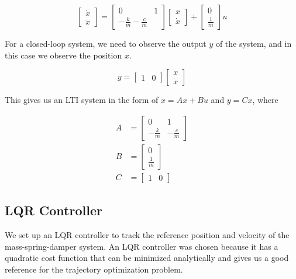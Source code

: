 \documentclass{article}
\begin{document}
\begin{equation}
  \begin{bmatrix}
    \dot{x} \\
    \ddot{x}
  \end{bmatrix} =
  \begin{bmatrix}
    0 & 1 \\
    -\frac{k}{m}  -\frac{c}{m}
  \end{bmatrix}
  \begin{bmatrix}
    x \\
    \dot{x}
  \end{bmatrix} +
  \begin{bmatrix}
    0 \\
    \frac{1}{m}
  \end{bmatrix} u
\end{equation}

For a closed-loop system, we need to observe the output $y$ of the system, and in this case we observe the position $x$.

\begin{equation}
  y =
  \begin{bmatrix}
    1 & 0
  \end{bmatrix}
  \begin{bmatrix}
    x \\
    \dot{x}
  \end{bmatrix}
\end{equation}

This gives us an LTI system in the form of $\dot{x} = Ax + Bu$ and $y = Cx$, where

\begin{equation}
  \begin{aligned}
    A &=
    \begin{bmatrix}
      0 & 1 \\
      -\frac{k}{m} & -\frac{c}{m}
    \end{bmatrix} \\
    B &=
    \begin{bmatrix}
      0 \\
      \frac{1}{m}
    \end{bmatrix} \\
    C &=
    \begin{bmatrix}
      1 & 0
    \end{bmatrix}
  \end{aligned}
\end{equation}

\subsection{LQR Controller}
We set up an LQR controller to track the reference position and velocity of the mass-spring-damper system.
An LQR controller was chosen because it has a quadratic cost function that can be minimized analytically and gives us a
good reference for the trajectory optimization problem.
\end{document}
